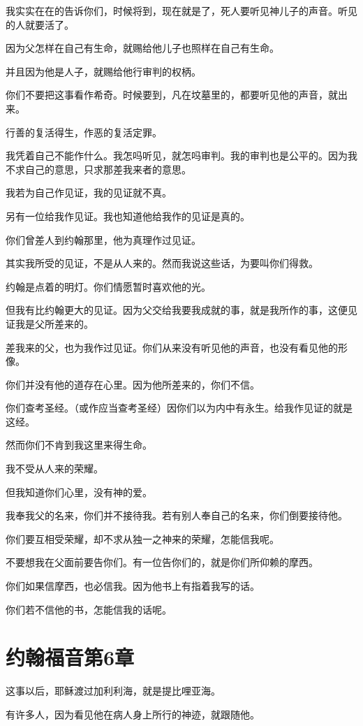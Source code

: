\documentclass[12pt,oneside]{book}
\begin{document}
我实实在在的告诉你们，时候将到，现在就是了，死人要听见神儿子的声音。听见的人就要活了。

因为父怎样在自己有生命，就赐给他儿子也照样在自己有生命。

并且因为他是人子，就赐给他行审判的权柄。

你们不要把这事看作希奇。时候要到，凡在坟墓里的，都要听见他的声音，就出来。

行善的复活得生，作恶的复活定罪。

我凭着自己不能作什么。我怎吗听见，就怎吗审判。我的审判也是公平的。因为我不求自己的意思，只求那差我来者的意思。

我若为自己作见证，我的见证就不真。

另有一位给我作见证。我也知道他给我作的见证是真的。

你们曾差人到约翰那里，他为真理作过见证。

其实我所受的见证，不是从人来的。然而我说这些话，为要叫你们得救。

约翰是点着的明灯。你们情愿暂时喜欢他的光。

但我有比约翰更大的见证。因为父交给我要我成就的事，就是我所作的事，这便见证我是父所差来的。

差我来的父，也为我作过见证。你们从来没有听见他的声音，也没有看见他的形像。

你们并没有他的道存在心里。因为他所差来的，你们不信。

你们查考圣经。（或作应当查考圣经）因你们以为内中有永生。给我作见证的就是这经。

然而你们不肯到我这里来得生命。

我不受从人来的荣耀。

但我知道你们心里，没有神的爱。

我奉我父的名来，你们并不接待我。若有别人奉自己的名来，你们倒要接待他。

你们要互相受荣耀，却不求从独一之神来的荣耀，怎能信我呢。

不要想我在父面前要告你们。有一位告你们的，就是你们所仰赖的摩西。

你们如果信摩西，也必信我。因为他书上有指着我写的话。

你们若不信他的书，怎能信我的话呢。

\chapter{约翰福音第6章}
这事以后，耶稣渡过加利利海，就是提比哩亚海。

有许多人，因为看见他在病人身上所行的神迹，就跟随他。
\end{document}
